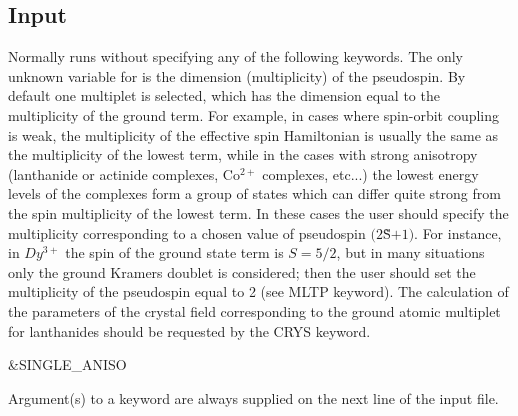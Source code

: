 \subsection{Input}
\label{UG:sec:single_aniso_input}

Normally  runs without specifying any of the following keywords. The only unknown variable for  is the dimension (multiplicity) of the pseudospin. By default one multiplet is selected, which has the dimension equal to the multiplicity of the ground term. For example, in cases where spin-orbit coupling is weak, the multiplicity of the effective spin Hamiltonian is usually the same as the multiplicity of the lowest term, while in the cases with strong anisotropy (lanthanide or actinide complexes, Co$^{2+}$ complexes, etc...) the lowest energy levels of the complexes form a group of states which can differ quite strong from the spin multiplicity of the lowest term. In these cases the user should specify the multiplicity corresponding to a chosen value of pseudospin $(2$\~S$+1)$. For instance, in $Dy^{3+}$ the spin of the ground state term is $S=5/2$, but in many situations only the ground Kramers doublet is considered; then the user should set the multiplicity of the pseudospin equal to 2 (see MLTP keyword).
The calculation of the parameters of the crystal field corresponding to the ground atomic multiplet for lanthanides should be requested by the CRYS keyword.

\begin{inputlisting}
 &SINGLE_ANISO
\end{inputlisting}

Argument(s) to a keyword are always supplied on the next line of the
input file.

